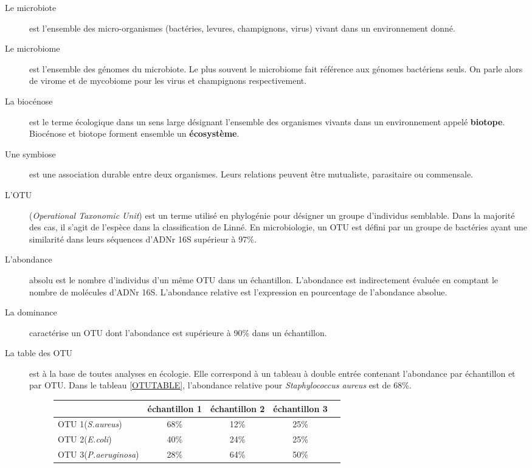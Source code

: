 \documentclass[12pt,a4paper]{article}
\begin{document}
\begin{description}
\item[Le microbiote\cite{Eisen} ]est l’ensemble des micro-organismes (bactéries, levures, champignons, virus) vivant dans un environnement donné.
  
\item[Le microbiome\cite{Eisen}] est l'ensemble des génomes du microbiote. Le plus souvent le microbiome fait référence aux génomes bactériens seuls. On parle alors de virome et de mycobiome pour les virus et champignons respectivement.

\item[La biocénose] est le terme écologique dans un sens large désignant l'ensemble des organismes vivants dans un environnement appelé \textbf{biotope}. Biocénose et biotope forment ensemble un \textbf{écosystème}.

\item[Une symbiose] est une association durable entre deux organismes. Leurs relations peuvent être mutualiste, parasitaire ou commensale.


\item[L'OTU] (\textit{Operational Taxonomic Unit}) est un terme utilisé en phylogénie pour désigner un groupe d’individus semblable. Dans la majorité des cas, il s'agit de l'espèce dans la classification de Linné.
En microbiologie, un OTU est défini par un groupe de bactéries ayant une similarité dans leurs séquences d'ADNr 16S supérieur à 97\%.

\item[L'abondance] absolu est le nombre d'individus d'un même OTU dans un échantillon. L'abondance est indirectement évaluée en comptant le nombre de molécules d'ADNr 16S. 
L’abondance relative est l'expression en pourcentage de l'abondance absolue.

\item[La dominance] caractérise un OTU dont l'abondance est supérieure à 90\% dans un échantillon.


\item[La table des OTU] est à la base de toutes analyses en écologie. Elle correspond à un tableau à double entrée contenant l’abondance par échantillon et par OTU. Dans le tableau \ref{OTUTABLE}, l'abondance relative pour \textit{Staphylococcus aureus} est de 68\%.

\begin{figure}[h]
\begin{center}
\begin{tabular}{|l|c|c|c|c}
  \hline
   & échantillon 1 & échantillon 2 & échantillon 3  \\
  \hline
  OTU 1(\textit{S.aureus}) & 68\% & 12\% & 25\% \\
  OTU 2(\textit{E.coli})& 40\% & 24\% & 25\% \\
  OTU 3(\textit{P.aeruginosa}) & 28\% & 64\% & 50\% \\


\end{tabular}
\end{center}
\end{figure}
\end{description}
\end{document}
